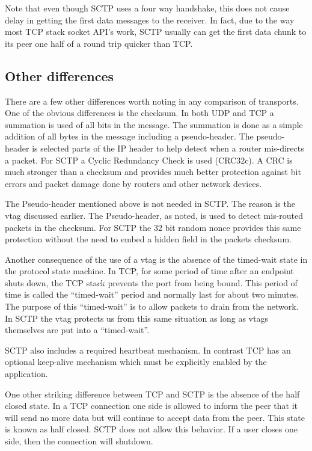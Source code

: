 \documentclass[conference]{IEEEtran}
\begin{document}
Note that even though SCTP uses a four way handshake, this does not
cause delay in getting the first data messages to the receiver. In fact,
due to the way most TCP stack socket API's work, SCTP usually can get
the first data chunk to its peer one half of a round trip quicker than TCP.

\subsection{Other differences}
\label{miscdiff}

There are a few other differences worth noting in any comparison of
transports. One of the obvious differences is the checksum. In both
UDP and TCP a summation is used of all bits in the message. The summation
is done as a simple addition of all bytes in the message including a
pseudo-header. The pseudo-header is selected parts of the IP
header to help detect when a router mis-directs a packet. For SCTP
a Cyclic Redundancy Check is used (CRC32c). A CRC is much stronger
than a checksum and provides much better protection against
bit errors and packet damage done by routers and other network
devices. 

The Pseudo-header mentioned above is not needed in SCTP. The reason
is the vtag discussed earlier. The Pseudo-header, as noted, is used to
detect mis-routed packets in the checksum. For SCTP the 32 bit random
nonce provides this same protection without the need to embed a
hidden field in the packets checksum.

Another consequence of the use of a vtag is the absence of 
the timed-wait state in the protocol state machine. In TCP, for
some period of time after an endpoint shuts down, the TCP stack
prevents the port from being bound. This period of time is called
the ``timed-wait'' period and normally last for about
two minutes.  The purpose of this ``timed-wait'' is to allow
packets to drain from the network. In SCTP the vtag protects
us from this same situation as long as vtags themselves are
put into a ``timed-wait''.

SCTP also includes a required heartbeat mechanism. In contrast
TCP has an optional keep-alive mechanism which must be explicitly
enabled by the application. 

One other striking difference between TCP and SCTP is the absence
of the half closed state. In a TCP connection one side is allowed to
inform the peer that it will send no more data but will continue to accept
data from the peer. This state is known as half closed. SCTP does not
allow this behavior. If a user closes one side, then the connection will
shutdown.
\end{document}
